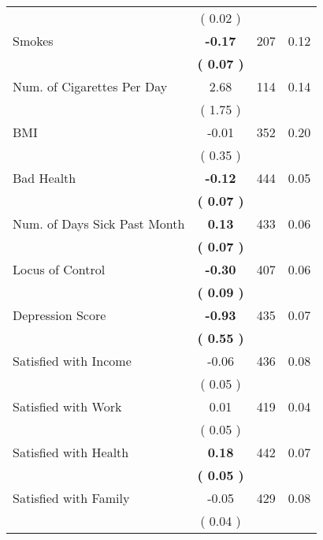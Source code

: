 \begin{tabular}{lccc}
 & (     0.02 ) & \\
Smokes & \textbf{    -0.17} & 207 &      0.12 \\ 
 & \textbf{(     0.07 )} & \\
Num. of Cigarettes Per Day &      2.68 & 114 &      0.14 \\ 
 & (     1.75 ) & \\
BMI &     -0.01 & 352 &      0.20 \\ 
 & (     0.35 ) & \\
Bad Health & \textbf{    -0.12} & 444 &      0.05 \\ 
 & \textbf{(     0.07 )} & \\
Num. of Days Sick Past Month & \textbf{     0.13} & 433 &      0.06 \\ 
 & \textbf{(     0.07 )} & \\
Locus of Control & \textbf{    -0.30} & 407 &      0.06 \\ 
 & \textbf{(     0.09 )} & \\
Depression Score & \textbf{    -0.93} & 435 &      0.07 \\ 
 & \textbf{(     0.55 )} & \\
Satisfied with Income &     -0.06 & 436 &      0.08 \\ 
 & (     0.05 ) & \\
Satisfied with Work &      0.01 & 419 &      0.04 \\ 
 & (     0.05 ) & \\
Satisfied with Health & \textbf{     0.18} & 442 &      0.07 \\ 
 & \textbf{(     0.05 )} & \\
Satisfied with Family &     -0.05 & 429 &      0.08 \\ 
 & (     0.04 ) & \\
\bottomrule
\end{tabular}
